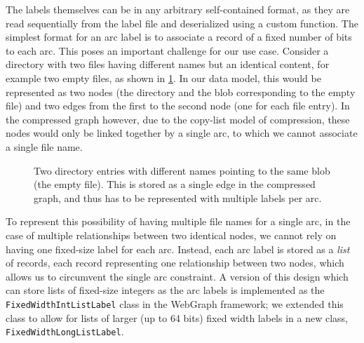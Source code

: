 
The labels themselves can be in any arbitrary self-contained format, as they
are read sequentially from the label file and deserialized using a custom
function. The simplest format for an arc label is to associate a record of a
fixed number of bits to each arc. This poses an important challenge for
our use case. Consider a directory with two files having different names but
an identical content, for example two empty files, as shown in
\cref{fig:multiple-labels}. In our data model, this would be represented as two
nodes (the directory and the blob corresponding to the empty file) and two
edges from the first to the second node (one for each file entry). In the
compressed graph however, due to the copy-list model of compression, these
nodes would only be linked together by a single arc, to which we cannot
associate a single file name.

\begin{figure}
    \centering
    \caption{Two directory entries with different names pointing to the same
    blob (the empty file). This is stored as a single edge in the compressed
    graph, and thus has to be represented with multiple labels per arc.}%
    \label{fig:multiple-labels}
\end{figure}


To represent this possibility of having multiple file names for a single arc,
in the case of multiple relationships between two identical nodes, we cannot
rely on having one fixed-size label for each arc. Instead, each arc label is
stored as a \emph{list} of records, each record representing one relationship
between two nodes, which allows us to circumvent the single arc constraint.
A version of this design which can store lists of fixed-size integers as the
arc labels is implemented as the \texttt{FixedWidthIntListLabel} class in the
WebGraph framework; we extended this class to allow for lists of larger (up to
64 bits) fixed width labels in a new class, \texttt{FixedWidthLongListLabel}.

